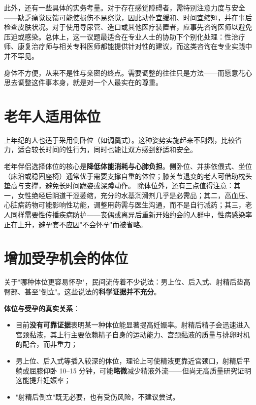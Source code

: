 \documentclass[12pt,UTF8]{ctexbook}
\begin{document}
此外，还有一些具体的实务考量。对于存在感觉障碍者，需特别注意力度与安全——缺乏痛觉反馈可能使损伤不易察觉，因此动作宜缓和、时间宜缩短，并在事后检查皮肤状况。对于使用导尿管、造口或其他医疗装置者，应事先咨询医师以避免压迫或感染。总体上，这一议题最适合在专业人士的协助下个别化处理：性治疗师、康复治疗师与相关专科医师都能提供针对性的建议，而这类咨询在专业实践中并不罕见。

\begin{tcolorbox}[colback=pink!5!white,colframe=red!50!black,title=贴心小叮咛]
身体不方便，从来不是性与亲密的终点。需要调整的往往只是方法——而愿意花心思去调整这件事本身，就是对一个人最实在的尊重。
\end{tcolorbox}

\section{老年人适用体位}

上年纪的人也适于采用侧卧位（如调羹式）。这种姿势实施起来不剧烈，比较省力，适合较长时间的性行为，同时也能让双方感到舒适和安全。

\vspace{0.5em}

老年伴侣选择体位的核心是\textbf{降低体能消耗与心肺负担}。侧卧位、并排依偎式、坐位（床沿或稳固座椅）通常优于需要支撑自重的体位；膝关节退变的老人可借助枕头垫高与支撑，避免长时间跪姿或深蹲动作。
除体位外，还有三点值得注意：其一，女性绝经后阴道干涩萎缩，充分的水基润滑剂几乎是必需品；其二，高血压、心脏病药物可能影响性功能，调整用药需与医生沟通，而不是自行减药；其三，老人同样需要性传播疾病防护——丧偶或离异后重新开始约会的人群中，性病感染率正在上升，避孕套不应因"不会怀孕"而被省略。

\section{增加受孕机会的体位}

关于"哪种体位更容易怀孕"，民间流传着不少说法：男上位、后入式、射精后垫高臀部、甚至"倒立"。这些说法的\textbf{科学证据并不充分}。

\noindent\textbf{体位与受孕的真实关系}：
\begin{itemize}
	\item 目前\textbf{没有可靠证据}表明某一种体位能显著提高妊娠率。射精后精子会迅速进入宫颈黏液，其上行主要依赖精子自身的运动能力、宫颈黏液的质量与排卵时机的配合，而非重力；
	\item 男上位、后入式等插入较深的体位，理论上可使精液更靠近宫颈口，射精后平躺或屈膝仰卧 10--15 分钟，可能\textbf{略微}减少精液外流——但尚无高质量研究证明这能提升妊娠率；
	\item "射精后倒立"既无必要，也有受伤风险，不建议尝试。
\end{itemize}
\end{document}

